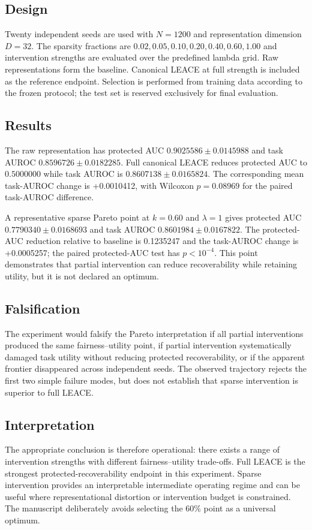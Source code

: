 \subsection{Design}
Twenty independent seeds are used with $N=1200$ and representation dimension $D=32$. The sparsity fractions are $0.02,0.05,0.10,0.20,0.40,0.60,1.00$ and intervention strengths are evaluated over the predefined lambda grid. Raw representations form the baseline. Canonical LEACE at full strength is included as the reference endpoint. Selection is performed from training data according to the frozen protocol; the test set is reserved exclusively for final evaluation.

\subsection{Results}
The raw representation has protected AUC $0.9025586\pm0.0145988$ and task AUROC $0.8596726\pm0.0182285$. Full canonical LEACE reduces protected AUC to $0.5000000$ while task AUROC is $0.8607138\pm0.0165824$. The corresponding mean task-AUROC change is +0.0010412, with Wilcoxon $p=0.08969$ for the paired task-AUROC difference.

A representative sparse Pareto point at $k=0.60$ and $\lambda=1$ gives protected AUC $0.7790340\pm0.0168693$ and task AUROC $0.8601984\pm0.0167822$. The protected-AUC reduction relative to baseline is 0.1235247 and the task-AUROC change is +0.0005257; the paired protected-AUC test has $p<10^{-4}$. This point demonstrates that partial intervention can reduce recoverability while retaining utility, but it is not declared an optimum.

\subsection{Falsification}
The experiment would falsify the Pareto interpretation if all partial interventions produced the same fairness--utility point, if partial intervention systematically damaged task utility without reducing protected recoverability, or if the apparent frontier disappeared across independent seeds. The observed trajectory rejects the first two simple failure modes, but does not establish that sparse intervention is superior to full LEACE.

\subsection{Interpretation}
The appropriate conclusion is therefore operational: there exists a range of intervention strengths with different fairness--utility trade-offs. Full LEACE is the strongest protected-recoverability endpoint in this experiment. Sparse intervention provides an interpretable intermediate operating regime and can be useful where representational distortion or intervention budget is constrained. The manuscript deliberately avoids selecting the 60\% point as a universal optimum.

